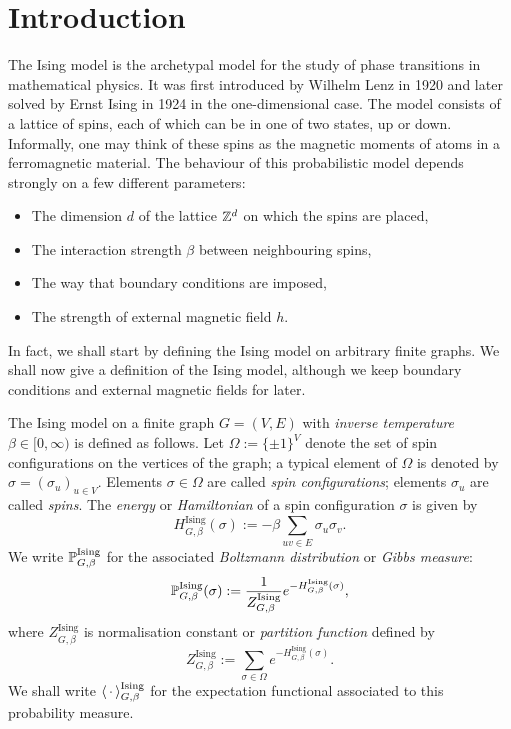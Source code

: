 \section{Introduction}
\label{sec:intro}

The Ising model is the archetypal model for the study of phase transitions in
mathematical physics.
It was first introduced by Wilhelm Lenz in 1920 and later solved by Ernst Ising
in 1924 in the one-dimensional case.
The model consists of a lattice of spins,
each of which can be in one of two states,
up or down.
Informally,
one may think of these spins as the magnetic moments of atoms in a ferromagnetic material.
The behaviour of this probabilistic model depends strongly on a few different parameters:
\begin{itemize}
    \item The dimension $d$ of the lattice $\Z^d$ on which the spins are placed,
    \item The interaction strength $\beta$ between neighbouring spins,
    \item The way that boundary conditions are imposed,
    \item The strength of external magnetic field $h$.
\end{itemize}
In fact, we shall start by defining the Ising model on arbitrary finite graphs.
We shall now give a definition of the Ising model, although
we keep boundary conditions and external magnetic fields for later.

\begin{definition}
    The Ising model on a finite graph \( G = (V, E) \) with \emph{inverse temperature} \( \beta \in [0,\infty) \) is defined as follows.
    Let $\Omega:=\{\pm1\}^V$ denote the set of spin configurations on the vertices of the graph;
    a typical element of $\Omega$ is denoted by $\sigma=(\sigma_u)_{u\in V}$.
    Elements $\sigma\in\Omega$ are called \emph{spin configurations};
    elements $\sigma_u$ are called \emph{spins}.
    The \emph{energy} or \emph{Hamiltonian} of a spin configuration $\sigma$ is given by
    \[
        H_{G,\beta}^{\operatorname{Ising}}(\sigma) := -\beta \sum_{uv \in E} \sigma_u \sigma_v.
    \]
    We write $\P_{G,\beta}^{\operatorname{Ising}}$ for the associated \emph{Boltzmann distribution} or \emph{Gibbs measure}:
    \[
        \P_{G,\beta}^{\operatorname{Ising}}(\sigma) := \frac{1}{Z_{G,\beta}^{\operatorname{Ising}}} e^{-H^{\operatorname{Ising}}_{G,\beta}(\sigma)},
    \]
    where \(Z_{G,\beta}^{\operatorname{Ising}}\) is normalisation constant or \emph{partition function} defined by
    \[
        Z_{G,\beta}^{\operatorname{Ising}}:= \sum_{\sigma\in\Omega} e^{-H^{\operatorname{Ising}}_{G,\beta}(\sigma)}.
    \]
    We shall write $\langle\blank\rangle_{G,\beta}^{\operatorname{Ising}}$ for the expectation functional associated to this probability measure.
\end{definition}

